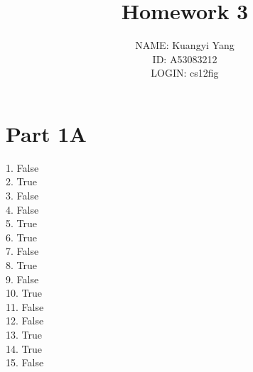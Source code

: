\documentclass[12pt]{article}
\title{Homework 3}
\author
{NAME: Kuangyi Yang\\
ID: A53083212\\
LOGIN: cs12fig
}
\date{}
\begin{document}
 


\baselineskip24pt


\maketitle 





\section*{ Part 1A}
1. False
\\2. True
\\3. False
\\4. False
\\5. True
\\6. True
\\7. False
\\8. True
\\9. False
\\10. True
\\11. False
\\12. False
\\13. True
\\14. True
\\15. False
\end{document}

